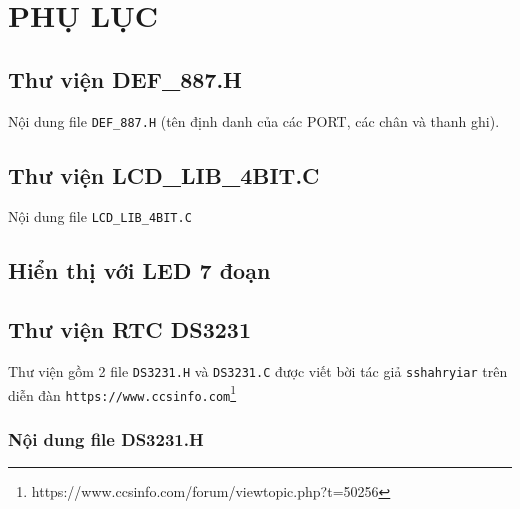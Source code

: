 \part*{PHỤ LỤC}

\chapter{Thư viện DEF\_887.H}\label{def:887}
Nội dung file \verb|DEF_887.H| (tên định danh của các PORT, các chân và thanh ghi).

\chapter{Thư viện LCD\_LIB\_4BIT.C}\label{def:lcd}
Nội dung file \verb|LCD_LIB_4BIT.C|

\chapter{Hiển thị với LED 7 đoạn}
\label{app:led-7-doan}

%
\chapter{Thư viện RTC DS3231} \label{def:DS3231}
Thư viện gồm 2 file \verb|DS3231.H| và \verb|DS3231.C| được viết bời tác giả \verb|sshahryiar| trên diễn đàn \verb|https://www.ccsinfo.com|\footnote{https://www.ccsinfo.com/forum/viewtopic.php?t=50256}
\section*{Nội dung file DS3231.H}

